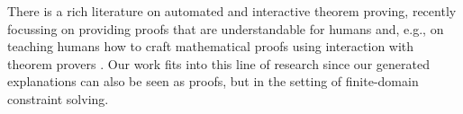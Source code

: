 

There is a rich literature on automated and interactive theorem proving, recently focussing on providing proofs that are understandable for humans \cite{Ganesalingam2017} and, e.g.,  on teaching humans how to craft mathematical proofs using interaction with theorem provers \cite{DBLP:conf/icml/YangD19}. 
Our work fits into this line of research since our generated explanations can also be seen as proofs, but in the setting of finite-domain constraint solving.




